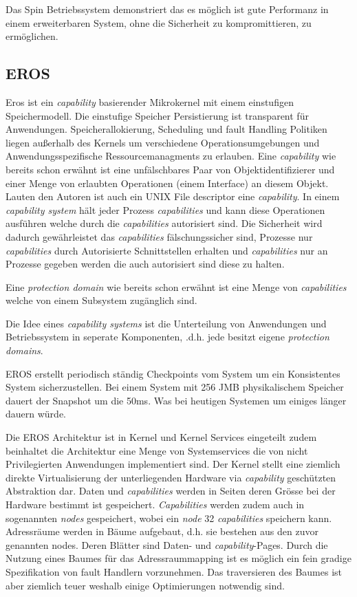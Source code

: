 \documentclass[9pt,technote]{IEEEtran}
\begin{document}
      Das Spin Betriebssystem demonstriert das es m\"oglich ist gute Performanz in einem erweiterbaren System, 
      ohne die Sicherheit zu kompromittieren, zu erm\"oglichen.
    \subsection{EROS}      
        Eros ist ein \textit{capability} basierender Mikrokernel mit einem einstufigen Speichermodell. 
        Die einstufige Speicher Persistierung ist transparent f\"ur Anwendungen.
        Speicherallokierung, Scheduling und fault Handling Politiken liegen au\ss erhalb des Kernels um 
        verschiedene Operationsumgebungen und Anwendungsspezifische Ressourcemanagments zu erlauben.
        Eine \textit{capability} wie bereits schon erw\"ahnt ist eine unf\"alschbares Paar von Objektidentifizierer 
        und einer Menge von erlaubten Operationen (einem Interface) an diesem Objekt.
        Lauten den Autoren ist auch ein UNIX File descriptor eine \textit{capability}. In einem \textit{capability system} 
        h\"alt jeder Prozess \textit{capabilities} und kann diese Operationen ausf\"uhren
        welche durch die \textit{capabilities} autorisiert sind. Die Sicherheit wird dadurch gew\"ahrleistet das \textit{capabilities} 
        f\"alschungssicher sind, Prozesse nur \textit{capabilities} durch
        Autorisierte Schnittstellen erhalten und \textit{capabilities} nur an Prozesse gegeben werden die auch autorisiert sind diese zu halten.
        
        Eine \textit{protection domain} wie bereits schon erw\"ahnt ist eine Menge von \textit{capabilities} welche von einem Subsystem zug\"anglich sind.
        
        Die Idee eines \textit{capability systems} ist die Unterteilung von Anwendungen und Betriebssystem in seperate Komponenten, .d.h. jede besitzt eigene \textit{protection domains}.
        
        EROS erstellt periodisch st\"andig Checkpoints vom System um ein Konsistentes System sicherzustellen. Bei einem System mit 256 JMB physikalischem Speicher dauert der Snapshot um die
        50ms. Was bei heutigen Systemen um einiges l\"anger dauern w\"urde.

        Die EROS Architektur ist in Kernel und Kernel Services eingeteilt zudem beinhaltet die Architektur eine Menge von Systemservices die von nicht Privilegierten Anwendungen implementiert sind.
        Der Kernel stellt eine ziemlich direkte Virtualisierung der unterliegenden Hardware via \textit{capability} gesch\"utzten Abstraktion dar.
        Daten und \textit{capabilities } werden in Seiten deren Gr\"osse bei der Hardware bestimmt ist gespeichert. \textit{Capabilities} werden zudem auch in sogenannten \textit{nodes} gespeichert,
        wobei ein \textit{node} 32 \textit{capabilities} speichern kann. Adressr\"aume werden in B\"aume aufgebaut, d.h. sie bestehen aus den zuvor genannten nodes. Deren Bl\"atter
        sind Daten- und \textit{capability}-Pages. Durch die Nutzung eines Baumes f\"ur das Adressraummapping ist es m\"oglich ein fein gradige Spezifikation von fault Handlern vorzunehmen.
        Das traversieren des Baumes ist aber ziemlich teuer weshalb einige Optimierungen notwendig sind. 
        
\end{document}
